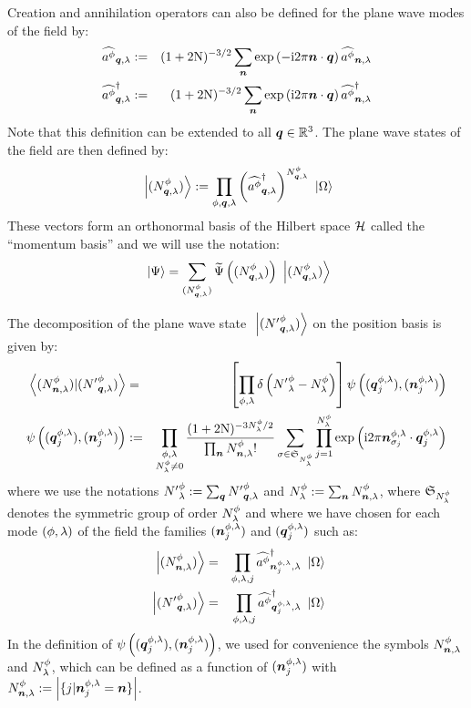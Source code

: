 \documentclass[10pt,a4paper,twoside,openany]{book}
\begin{document}
 Creation and annihilation operators can also be defined for the plane wave modes of the field by:
\begin{eqnarray*}
\aop \pt \q \sp & \eqdef & (1+2 \N)^{-3/2} \sum_{\n} \exp{-\i 2 \pi \n \ssp \q} \aop \pt \n \sp \\
\cop \pt \q \sp & \eqdef & (1+2 \N)^{-3/2} \sum_{\n} \exp{\i 2 \pi \n \ssp \q} \cop \pt \n \sp
\end{eqnarray*}
Note that this definition can be extended to all $\q \in \IR^3$. The plane wave states of the field are then defined by:
\begin{equation*}
\ket{\bFQ N \pt \q \sp} \eqdef \prod_{\pt,\q,\sp} \left( \cop \pt \q \sp \right)^{\bQ N \pt \q \sp} \ket{\vac}
\end{equation*}
These vectors form an orthonormal basis of the Hilbert space $\H$ called the ``momentum basis'' and we will use the notation:
\begin{equation*}
\ket\Psi = \sum_{\bFQ N \pt \q \sp} \FT\Psi \left( \bFQ N \pt \q \sp \right) \ket{\bFQ N \pt \q \sp}
\end{equation*}

 The decomposition of the plane wave state $\ket{\bFQ {N'} \pt \q \sp}$ on the position basis is given by:
\begin{eqnarray*}
\braket{\bFX N \pt \n \sp}{\bFQ {N'} \pt \q \sp} & = & \left[ \prod_{\pt, \sp} \delta\left( {N'}^\pt_\sp - N^\pt_\sp \right) \right] \psi \left( ( \q^{\pt, \sp}_j ), ( \n^{\pt, \sp}_j ) \right) \\
\psi \left( ( \q^{\pt, \sp}_j ), ( \n^{\pt, \sp}_j ) \right) & \eqdef & \prod_{\substack{\pt, \sp \\ N^\pt_\sp \neq 0}} \frac{(1+2 \N)^{-3 N^\pt_\sp / 2} }{\prod_{\n} \bX N \pt \n \sp !} \sum_{\sigma \in \mathfrak{S}_{N^\pt_\sp}} \prod_{j = 1}^{N^\pt_\sp} \exp{\i 2 \pi \n^{\pt, \sp}_{\sigma_j} \ssp \q^{\pt, \sp}_j}
\end{eqnarray*}
where we use the notations ${N'}^\pt_\sp \eqdef \sum_{\q} \bQ {N'} \pt \q \sp$ and $N^\pt_\sp \eqdef \sum_{\n} \bX N \pt \n \sp$, where $\mathfrak{S}_{N^\pt_\sp}$ denotes the symmetric group of order $N^\pt_\sp$ and where we have chosen for each mode $( \pt, \sp )$ of the field the families $( \n^{\pt, \sp}_j )$ and $( \q^{\pt, \sp}_j )$ such as:
\begin{eqnarray*}
\ket{\bFX N \pt \n \sp} & = & \prod_{\pt, \sp, j} \cop \pt {\n^{\pt, \sp}_j} \sp \ket{\vac} \\
\ket{\bFQ {N'} \pt \q \sp} & = & \prod_{\pt, \sp, j} \cop \pt {\q^{\pt, \sp}_j} \sp \ket{\vac}
\end{eqnarray*}
In the definition of $\psi \left( ( \q^{\pt, \sp}_j ), ( \n^{\pt, \sp}_j ) \right)$, we used for convenience the symbols $\bX N \pt \n \sp$ and $N^\pt_\sp$, which can be defined as a function of $( \n^{\pt, \sp}_j )$ with $\bX N \pt \n \sp \eqdef \left|  \{ j | \n^{\pt, \sp}_j = \n \} \right|$.
\end{document}
